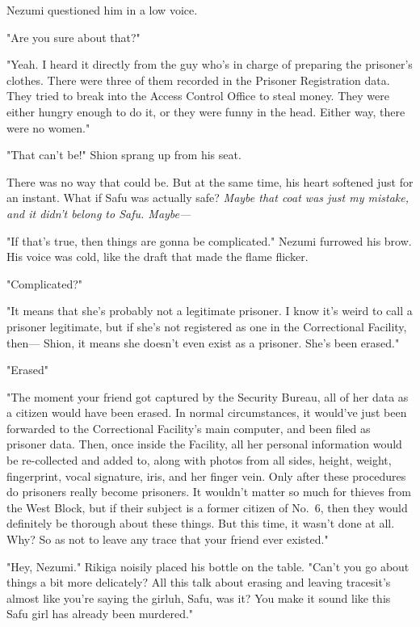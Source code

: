 Nezumi questioned him in a low voice.

"Are you sure about that?"

"Yeah. I heard it directly from the guy who's in charge of preparing the
prisoner's clothes. There were three of them recorded in the Prisoner
Registration data. They tried to break into the Access Control Office to
steal money. They were either hungry enough to do it, or they were funny
in the head. Either way, there were no women."

"That can't be!" Shion sprang up from his seat.

There was no way that could be. But at the same time, his heart softened
just for an instant. What if Safu was actually safe? \emph{Maybe that coat was
just my mistake, and it didn't belong to Safu. Maybe---}

"If that's true, then things are gonna be complicated." Nezumi furrowed
his brow. His voice was cold, like the draft that made the flame
flicker.

"Complicated?"

"It means that she's probably not a legitimate prisoner. I know it's
weird to call a prisoner legitimate, but if she's not registered as one
in the Correctional Facility, then--- Shion, it means she doesn't even
exist as a prisoner. She's been erased."

"Erased\el "

"The moment your friend got captured by the Security Bureau, all of her
data as a citizen would have been erased. In normal circumstances, it
would've just been forwarded to the Correctional Facility's main
computer, and been filed as prisoner data. Then, once inside the
Facility, all her personal information would be re-collected and added
to, along with photos from all sides, height, weight, fingerprint, vocal
signature, iris, and her finger vein. Only after these procedures do
prisoners really become prisoners. It wouldn't matter so much for
thieves from the West Block, but if their subject is a former citizen of
No.~6, then they would definitely be thorough about these things. But
this time, it wasn't done at all. Why? So as not to leave any trace that
your friend ever existed."

"Hey, Nezumi." Rikiga noisily placed his bottle on the table. "Can't you
go about things a bit more delicately? All this talk about erasing and
leaving traces\el it's almost like you're saying the girl\el uh, Safu,
was it? You make it sound like this Safu girl has already been
murdered."

